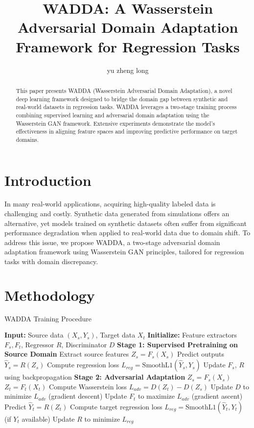 \documentclass{article}
\title{WADDA: A Wasserstein Adversarial Domain Adaptation Framework for Regression Tasks}
\author{yu zheng long}
\date{}
\begin{document}
\maketitle

\begin{abstract}
This paper presents WADDA (Wasserstein Adversarial Domain Adaptation), a novel deep learning framework designed to bridge the domain gap between synthetic and real-world datasets in regression tasks. WADDA leverages a two-stage training process combining supervised learning and adversarial domain adaptation using the Wasserstein GAN framework. Extensive experiments demonstrate the model's effectiveness in aligning feature spaces and improving predictive performance on target domains.
\end{abstract}

\section{Introduction}
In many real-world applications, acquiring high-quality labeled data is challenging and costly. Synthetic data generated from simulations offers an alternative, yet models trained on synthetic datasets often suffer from significant performance degradation when applied to real-world data due to domain shift. To address this issue, we propose WADDA, a two-stage adversarial domain adaptation framework using Wasserstein GAN principles, tailored for regression tasks with domain discrepancy.

\section{Methodology}
\begin{algorithm}
\caption{WADDA Training Procedure}
\begin{algorithmic}[1]
\State \textbf{Input:} Source data $(X_s, Y_s)$, Target data $X_t$
\State \textbf{Initialize:} Feature extractors $F_s, F_t$, Regressor $R$, Discriminator $D$
\State \textbf{Stage 1: Supervised Pretraining on Source Domain}
    \State Extract source features $Z_s = F_s(X_s)$
    \State Predict outputs $\hat{Y}_s = R(Z_s)$
    \State Compute regression loss $L_{reg} = \text{SmoothL1}(\hat{Y}_s, Y_s)$
    \State Update $F_s$, $R$ using backpropagation
\EndFor
\State \textbf{Stage 2: Adversarial Adaptation}
        \State $Z_s = F_s(X_s)$ 
        \State $Z_t = F_t(X_t)$
        \State Compute Wasserstein loss $L_{adv} = D(Z_t) - D(Z_s)$
        \State Update $D$ to minimize $L_{adv}$ (gradient descent)
        \State Update $F_t$ to maximize $L_{adv}$ (gradient ascent)
        \State Predict $\hat{Y}_t = R(Z_t)$
        \State Compute target regression loss $L_{reg} = \text{SmoothL1}(\hat{Y}_t, Y_t)$ (if $Y_t$ available)
        \State Update $R$ to minimize $L_{reg}$
    \EndFor
\EndFor
\end{algorithmic}
\end{algorithm}
\end{document}
